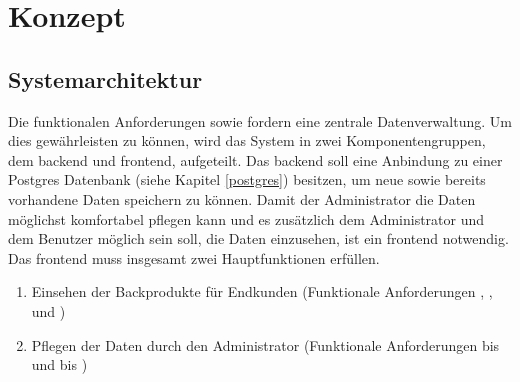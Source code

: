 \chapter{Konzept}

\section{Systemarchitektur} \label{systemarchitektur}
Die funktionalen Anforderungen  sowie  fordern eine zentrale Datenverwaltung.
Um dies gewährleisten zu können, wird das System in zwei Komponentengruppen, dem \gls{backend} und \gls{frontend}, aufgeteilt.
Das \gls{backend} soll eine Anbindung zu einer Postgres Datenbank (siehe Kapitel \ref{postgres}) besitzen, um neue sowie bereits vorhandene Daten speichern zu können.
Damit der Administrator die Daten möglichst komfortabel pflegen kann und es zusätzlich dem Administrator und dem Benutzer möglich sein soll, die Daten einzusehen, ist ein \gls{frontend} notwendig.
Das \gls{frontend} muss insgesamt zwei Hauptfunktionen erfüllen.

\begin{enumerate}
	\item Einsehen der Backprodukte für Endkunden (Funktionale Anforderungen , ,  und )
	\item Pflegen der Daten durch den Administrator (Funktionale Anforderungen  bis  und  bis )
\end{enumerate}

